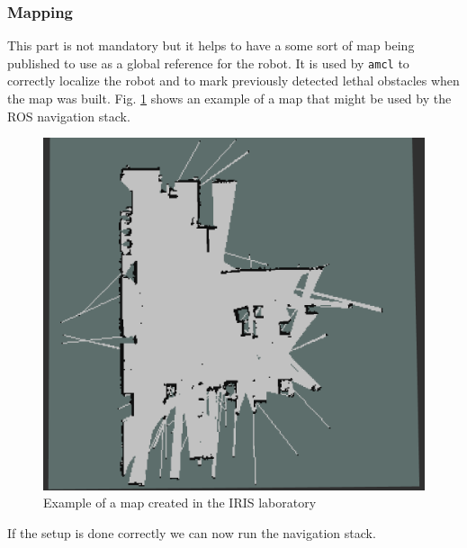 \subsubsection{Mapping}
This part is not mandatory but it helps to have a some sort of map being published to use as a global reference for the robot. It is used by \texttt{amcl} to correctly localize the robot and to mark previously detected lethal obstacles when the map was built. Fig. \ref{fig:map} shows an example of a map that might be used by the ROS navigation stack.
\begin{figure}[!htb]
    \centering
    \includegraphics[scale=0.4]{imgs/chapter3/map2.png}
    \caption{Example of a map created in the IRIS laboratory}
    \label{fig:map}
\end{figure}
If the setup is done correctly we can now run the navigation stack.
